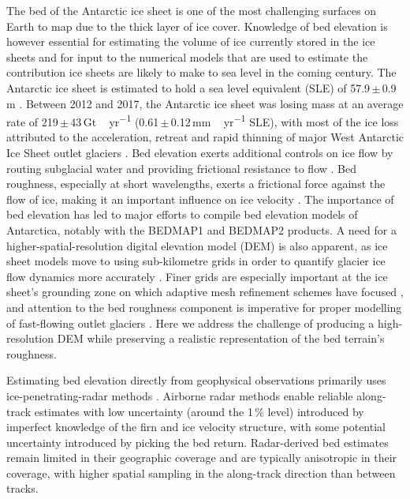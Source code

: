 \documentclass[tc, noline]{copernicus}
\begin{document}
The bed of the Antarctic ice sheet is one of the most challenging surfaces on Earth to map due to the thick layer of ice cover.
Knowledge of bed elevation is however essential for estimating the volume of ice currently stored in the ice sheets and for input to the numerical models that are used to estimate the contribution ice sheets are likely to make to sea level in the coming century.
The Antarctic ice sheet is estimated to hold a sea level equivalent (SLE) of 57.9\,$\pm$\,0.9\,\unit{m} \citep{MorlighemDeepglacialtroughs2019}.
Between 2012 and 2017, the Antarctic ice sheet was losing mass at an average rate of 219\,$\pm$\,43\,\unit{Gt\,yr^{-1}} (0.61\,$\pm$\,0.12\,\unit{mm\,yr^{-1}} SLE), with most of the ice loss attributed to the acceleration, retreat and rapid thinning of major West Antarctic Ice Sheet outlet glaciers \citep{IMBIEMassbalanceAntarctic2018}.
Bed elevation exerts additional controls on ice flow by routing subglacial water and providing frictional resistance to flow \citep{SiegertMacroscalebedroughness2004}.
Bed roughness, especially at short wavelengths, exerts a frictional force against the flow of ice, making it an important influence on ice velocity \citep{BinghamDiverselandscapesPine2017,FalciniQuantifyingbedroughness2018}.
The importance of bed elevation has led to major efforts to compile bed elevation models of Antarctica, notably with the BEDMAP1 \citep{LytheBEDMAPnewice2001} and BEDMAP2 \citep{FretwellBedmap2improvedice2013} products.
A need for a higher-spatial-resolution digital elevation model (DEM) is also apparent, as ice sheet models move to using sub-kilometre grids in order to quantify glacier ice flow dynamics more accurately \citep{LeBrocqimprovedAntarcticdataset2010,Grahamhighresolutionsyntheticbed2017}.
Finer grids are especially important at the ice sheet's grounding zone on which adaptive mesh refinement schemes have focused \citep[e.g.][]{CornfordAdaptivemeshrefinement2016}, and attention to the bed roughness component is imperative for proper modelling of fast-flowing outlet glaciers \citep{DurandImpactbedrockdescription2011,NiasContrastingmodelledsensitivity2016}.
Here we address the challenge of producing a high-resolution DEM while preserving a realistic representation of the bed terrain's roughness.

Estimating bed elevation directly from geophysical observations primarily uses ice-penetrating-radar methods \citep[e.g.][]{RobinRadioechoexploration1970}.
Airborne radar methods enable reliable along-track estimates with low uncertainty (around the 1\,{\%} level) introduced by imperfect knowledge of the firn and ice velocity structure, with some potential uncertainty introduced by picking the bed return.
Radar-derived bed estimates remain limited in their geographic coverage \citep{FretwellBedmap2improvedice2013} and are typically anisotropic in their coverage, with higher spatial sampling in the along-track direction than between tracks.
\end{document}
